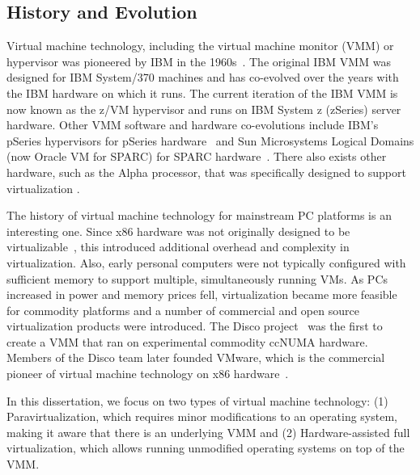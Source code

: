 \subsection{History and Evolution}
\label{sec:related-history-evolution}

Virtual machine technology, including the virtual machine monitor (VMM) or hypervisor was pioneered by IBM in the 1960s~\cite{creasy_1981}. The original IBM VMM was designed for IBM System/370 machines and has co-evolved over the years with the IBM hardware on which it runs.  The current iteration of the IBM VMM is now known as the z/VM hypervisor and runs on IBM System z (zSeries) server hardware. Other VMM software and hardware co-evolutions include IBM's pSeries hypervisors for pSeries hardware~\cite{armstrong_power5_2005,blank_p5_2005} and Sun Microsystems Logical Domains (now Oracle VM for SPARC) for SPARC hardware~\cite{sparc_architecture_2005,sparc_vm_2006}. There also exists other hardware, such as the Alpha processor, that was specifically designed to support virtualization \cite{karger_2007}. 

The history of virtual machine technology for mainstream PC platforms is an interesting one. Since x86 hardware was not originally designed to be virtualizable~\cite{popek_1974}, this introduced additional overhead and complexity in virtualization. Also, early personal computers were not typically configured with sufficient memory to support multiple, simultaneously running VMs.  As PCs increased in power and memory prices fell, virtualization became more feasible for commodity platforms and a number of commercial and open source virtualization products were introduced. The Disco project~\cite{bugnion_1997} was the first to create a VMM that ran on experimental commodity ccNUMA hardware. Members of the Disco team later founded VMware, which is the commercial pioneer of virtual machine technology on x86 hardware~\cite{vmware_website,adams_2006}.
 
In this dissertation, we focus on two types of virtual machine technology: (1) Paravirtualization, which requires minor modifications to an operating system, making it aware that there is an underlying VMM and (2) Hardware-assisted full virtualization, which allows running unmodified operating systems on top of the VMM.

